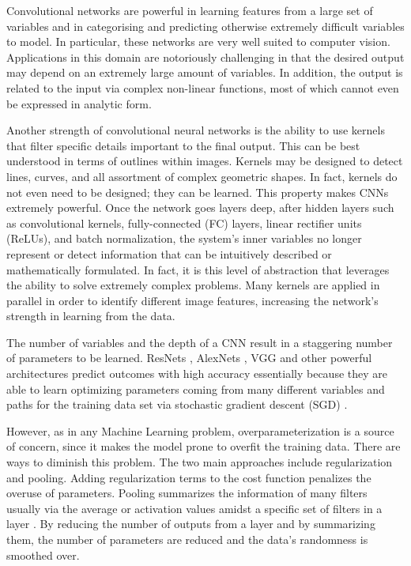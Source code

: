 \documentclass[12pt, a4paper]{article}
\begin{document}
Convolutional networks are powerful in learning features from a large set of variables and in categorising and predicting otherwise extremely difficult variables to model. In particular, these networks are very well suited to computer vision. Applications in this domain are notoriously challenging in that the desired output may depend on an extremely large amount of variables. In addition, the output is related to the input via complex non-linear functions, most of which cannot even be expressed in analytic form. 
	
Another strength of convolutional neural networks is the ability to use kernels that filter specific details important to the final output. This can be best understood in terms of outlines within images. Kernels may be designed to detect lines, curves, and all assortment of complex geometric shapes. In fact, kernels do not even need to be designed; they can be learned. This property makes CNNs extremely powerful. Once the network goes layers deep, after hidden layers such as convolutional kernels, fully-connected (FC) layers, linear rectifier units (ReLUs), and batch normalization, the system’s inner variables no longer represent or detect information that can be intuitively described or mathematically formulated. In fact, it is this level of abstraction that leverages the ability to solve extremely complex problems. Many kernels are applied in parallel in order to identify different image features, increasing the network’s strength in learning from the data.

The number of variables and the depth of a CNN result in a staggering number of parameters to be learned. ResNets \cite{he_deep_2015}, AlexNets \cite{krizhevsky_imagenet_2012}, VGG \cite{simonyan_very_2014} and other powerful architectures predict outcomes with high accuracy essentially because they are able to learn optimizing parameters coming from many different variables and paths for the training data set via stochastic gradient descent (SGD) \cite{nielsen_neural_2015}.

However, as in any Machine Learning problem, overparameterization is a source of concern, since it makes the model prone to overfit the training data. There are ways to diminish this problem. The two main approaches include regularization and pooling. Adding regularization terms to the cost function penalizes the overuse of parameters. Pooling summarizes the information of many filters usually via the average or activation values amidst a specific set of filters in a layer \cite[Chapter~9]{Goodfellow-et-al-2016}. By reducing the number of outputs from a layer and by summarizing them, the number of parameters are reduced and the data’s randomness is smoothed over. 
\end{document}
